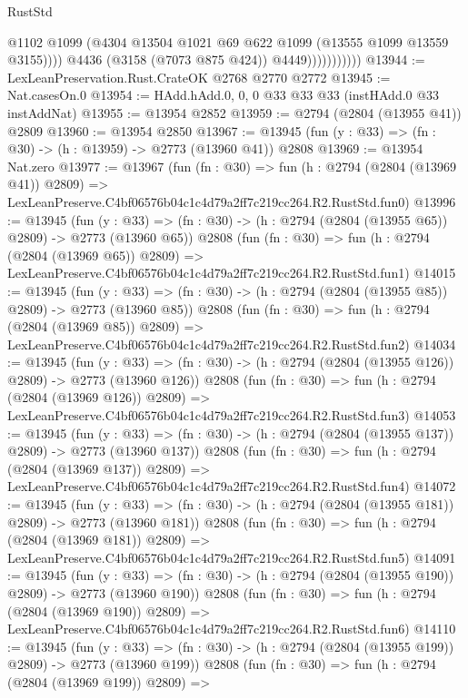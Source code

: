 \begin{lexlean}{RustStd}
\begin{coremodule}
                              @1102
                              @1099
                              (@4304 @13504 @1021 @69 @622 @1099 (@13555 @1099 @13559 @3155))))
                          @4436
                          (@3158 (@7073 @875 @424))
                          @4449)))))))))))
@13944 := LexLeanPreservation.Rust.CrateOK @2768 @2770 @2772
@13945 := Nat.casesOn.{0}
@13954 := HAdd.hAdd.{0, 0, 0} @33 @33 @33 (instHAdd.{0} @33 instAddNat)
@13955 := @13954 @2852
@13959 := @2794 (@2804 (@13955 @41)) @2809
@13960 := @13954 @2850
@13967 := @13945 (fun (y : @33) => (fn : @30) -> (h : @13959) -> @2773 (@13960 @41)) @2808
@13969 := @13954 Nat.zero
@13977 := @13967
    (fun (fn : @30) =>
    fun (h : @2794 (@2804 (@13969 @41)) @2809) =>
    LexLeanPreserve.C4bf06576b04c1c4d79a2ff7c219cc264.R2.RustStd.fun0)
@13996 := @13945
    (fun (y : @33) => (fn : @30) -> (h : @2794 (@2804 (@13955 @65)) @2809) -> @2773 (@13960 @65))
    @2808
    (fun (fn : @30) =>
    fun (h : @2794 (@2804 (@13969 @65)) @2809) =>
    LexLeanPreserve.C4bf06576b04c1c4d79a2ff7c219cc264.R2.RustStd.fun1)
@14015 := @13945
    (fun (y : @33) => (fn : @30) -> (h : @2794 (@2804 (@13955 @85)) @2809) -> @2773 (@13960 @85))
    @2808
    (fun (fn : @30) =>
    fun (h : @2794 (@2804 (@13969 @85)) @2809) =>
    LexLeanPreserve.C4bf06576b04c1c4d79a2ff7c219cc264.R2.RustStd.fun2)
@14034 := @13945
    (fun (y : @33) => (fn : @30) -> (h : @2794 (@2804 (@13955 @126)) @2809) -> @2773 (@13960 @126))
    @2808
    (fun (fn : @30) =>
    fun (h : @2794 (@2804 (@13969 @126)) @2809) =>
    LexLeanPreserve.C4bf06576b04c1c4d79a2ff7c219cc264.R2.RustStd.fun3)
@14053 := @13945
    (fun (y : @33) => (fn : @30) -> (h : @2794 (@2804 (@13955 @137)) @2809) -> @2773 (@13960 @137))
    @2808
    (fun (fn : @30) =>
    fun (h : @2794 (@2804 (@13969 @137)) @2809) =>
    LexLeanPreserve.C4bf06576b04c1c4d79a2ff7c219cc264.R2.RustStd.fun4)
@14072 := @13945
    (fun (y : @33) => (fn : @30) -> (h : @2794 (@2804 (@13955 @181)) @2809) -> @2773 (@13960 @181))
    @2808
    (fun (fn : @30) =>
    fun (h : @2794 (@2804 (@13969 @181)) @2809) =>
    LexLeanPreserve.C4bf06576b04c1c4d79a2ff7c219cc264.R2.RustStd.fun5)
@14091 := @13945
    (fun (y : @33) => (fn : @30) -> (h : @2794 (@2804 (@13955 @190)) @2809) -> @2773 (@13960 @190))
    @2808
    (fun (fn : @30) =>
    fun (h : @2794 (@2804 (@13969 @190)) @2809) =>
    LexLeanPreserve.C4bf06576b04c1c4d79a2ff7c219cc264.R2.RustStd.fun6)
@14110 := @13945
    (fun (y : @33) => (fn : @30) -> (h : @2794 (@2804 (@13955 @199)) @2809) -> @2773 (@13960 @199))
    @2808
    (fun (fn : @30) =>
    fun (h : @2794 (@2804 (@13969 @199)) @2809) =>

\end{coremodule}
\end{lexlean}
